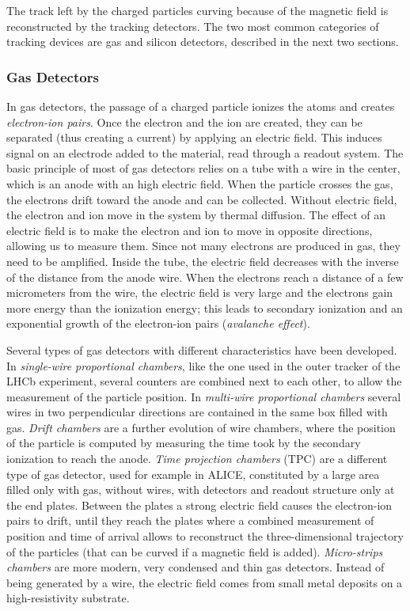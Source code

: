 The track left by the charged particles curving because of the magnetic field is reconstructed by the tracking detectors. The two most common categories of tracking devices are gas and silicon detectors, described in the next two sections.

\subsubsection*{Gas Detectors}

In gas detectors, the passage of a charged particle ionizes the atoms and creates \textit{electron-ion pairs}. Once the electron and the ion are created, they can be separated (thus creating a current) by applying an electric field. This induces signal on an electrode added to the material, read through a readout system. The basic principle of most of gas detectors relies on a tube with a wire in the center, which is an anode with an high electric field. When the particle crosses the gas, the electrons drift toward the anode and can be collected. Without electric field, the electron and ion move in the system by thermal diffusion. The effect of an electric field is to make the electron and ion to move in opposite directions, allowing us to measure them. Since not many electrons are produced in gas, they need to be amplified. Inside the tube, the electric field decreases with the inverse of the distance from the anode wire. When the electrons reach a distance of a few micrometers from the wire, the electric field is very large and the electrons gain more energy than the ionization energy; this leads to secondary ionization and an exponential growth of the electron-ion pairs (\textit{avalanche effect}). 

Several types of gas detectors with different characteristics have been developed. In \textit{single-wire proportional chambers}, like the one used in the outer tracker of the LHCb experiment, several counters are combined next to each other, to allow the measurement of the particle position. In \textit{multi-wire proportional chambers} \cite{CHARPAK1968262} several wires in two perpendicular directions are contained in the same box filled with gas. \textit{Drift chambers} are a further evolution of wire chambers, where the position of the particle is computed by measuring the time took by the secondary ionization to reach the anode. \textit{Time projection chambers} (TPC) are a different type of gas detector, used for example in ALICE, constituted by a large area filled only with gas, without wires, with detectors and readout structure only at the end plates. Between the plates a strong electric field causes the electron-ion pairs to drift, until they reach the plates where a combined measurement of position and time of arrival allows to reconstruct the three-dimensional trajectory of the particles (that can be curved if a magnetic field is added). \textit{Micro-strips chambers} \cite{OED1988351} are more modern, very condensed and thin gas detectors. Instead of being generated by a wire, the electric field comes from small metal deposits on a high-resistivity substrate.   

